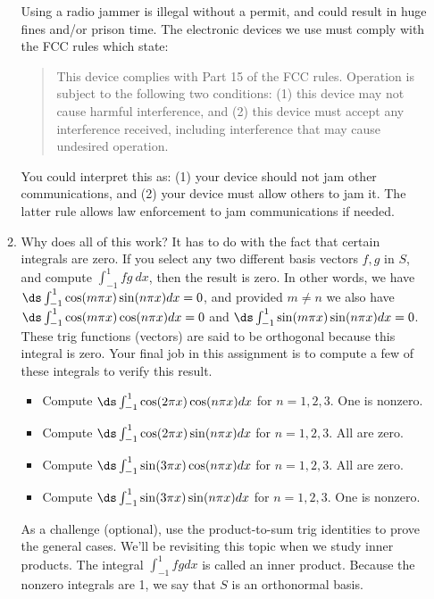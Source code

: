 \begin{enumerate}
\begin{enumerate}
Using a radio jammer is illegal without a permit, and could result in huge fines and/or prison time. The electronic devices we use must comply with the FCC rules which state:
\begin{quote}
This device complies with Part 15 of the FCC rules. Operation is subject to the following two conditions: (1) this device may not cause harmful interference, and (2) this device must accept any interference received, including interference that may cause undesired operation.
\end{quote} 
You could interpret this as: (1) your device should not jam other communications, and (2) your device must allow others to jam it.  The latter rule allows law enforcement to jam communications if needed.  

	\item Why does all of this work?  It has to do with the fact that certain integrals are zero.  If you select any two different basis vectors $f,g$ in $S$, and compute $\int_{-1}^1 fg\ dx$, then the result is zero. In other words, we have $\ds \int_{-1}^1 \cos(m\pi x)\sin(n \pi x) dx = 0$, and provided $m\neq n$ we also have $\ds \int_{-1}^1 \cos(m\pi x)\cos(n \pi x) dx = 0$ and $\ds \int_{-1}^1 \sin(m\pi x)\sin(n \pi x) dx = 0$. These trig functions (vectors) are said to be orthogonal because this integral is zero. Your final job in this assignment is to compute a few of these integrals to verify this result. \begin{itemize}
	\item Compute $\ds \int_{-1}^1 \cos(2\pi x)\cos(n \pi x) dx$ for $n=1,2,3$. One is nonzero.
	\item Compute $\ds \int_{-1}^1 \cos(2\pi x)\sin(n \pi x) dx$ for $n=1,2,3$. All are zero.
	\item Compute $\ds \int_{-1}^1 \sin(3\pi x)\cos(n \pi x) dx$ for $n=1,2,3$. All are zero.
	\item Compute $\ds \int_{-1}^1 \sin(3\pi x)\sin(n \pi x) dx$ for $n=1,2,3$. One is nonzero.
\end{itemize}
As a challenge (optional), use the product-to-sum trig identities to prove the general cases. 
We'll be revisiting this topic when we study inner products.  The integral $\int _{-1}^1 fg dx$ is called an inner product. Because the nonzero integrals are 1, we say that $S$ is an orthonormal basis.

\end{enumerate}


\end{enumerate}


